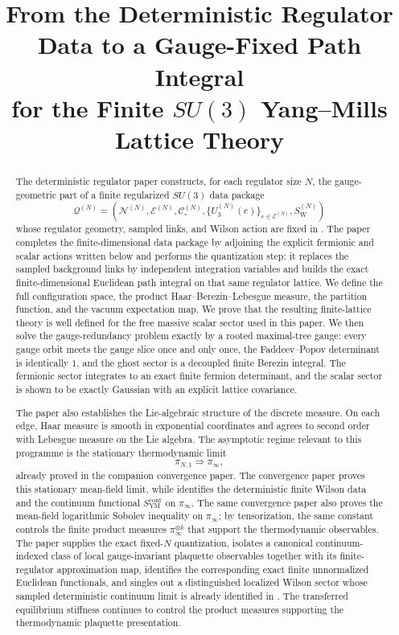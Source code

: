 \documentclass[11pt]{article}
\title{From the Deterministic Regulator Data to a Gauge-Fixed Path Integral\\
for the Finite $SU(3)$ Yang--Mills Lattice Theory}
\author{}
\date{}
\theoremstyle{remark}
\newcommand{\mcN}{\mathcal N}
\newcommand{\mcE}{\mathcal E}
\begin{document}
\maketitle

\begin{abstract}
The deterministic regulator paper constructs, for each regulator size \(N\), the
gauge-geometric part of a finite regularized \(SU(3)\) data package
\[
\mathcal Q^{(N)}=
(\mcN^{(N)},\mcE^{(N)},\mathcal C_\square^{(N)},
\{U_3^{(N)}(e)\}_{e\in\mcE^{(N)}},
S_{\mathrm W}^{(N)})
\]
whose regulator geometry, sampled links, and Wilson action are fixed in
\cite{continuumqft}.  The paper completes the finite-dimensional data
package by adjoining the explicit fermionic and scalar actions written below and
performs the
quantization step: it replaces the sampled background links by independent
integration variables and builds the exact finite-dimensional Euclidean path
integral on that same regulator lattice.  We define the full configuration
space, the product Haar--Berezin--Lebesgue measure, the partition function, and
the vacuum expectation map.  We prove that the resulting finite-lattice theory
is well defined for the free massive scalar sector used in this paper.  We then
solve the gauge-redundancy problem exactly by
a rooted maximal-tree gauge: every gauge orbit meets the gauge slice once and
only once, the Faddeev--Popov determinant is identically $1$, and the ghost
sector is a decoupled finite Berezin integral.  The fermionic sector integrates
to an exact finite fermion determinant, and the scalar sector is shown to be
exactly Gaussian with an explicit lattice covariance.

The paper also establishes the Lie-algebraic structure of the discrete measure.
On each edge, Haar measure is smooth in exponential coordinates and agrees to
second order with Lebesgue measure on the Lie algebra.
The asymptotic regime relevant to this programme is the stationary
thermodynamic limit
\[
\pi_{N,1}\Rightarrow \pi_\infty,
\]
already proved in the companion convergence paper.  The convergence paper
\cite{convergence} proves this stationary mean-field limit, while
\cite{continuumqft} identifies the deterministic finite Wilson data and the
continuum functional \(S_{\mathrm{YM}}^{\mathrm{cont}}\) on
$\pi_\infty$.  The same convergence paper also proves the mean-field
logarithmic Sobolev inequality on $\pi_\infty$; by tensorization, the same
constant controls the finite product measures $\pi_\infty^{\otimes k}$ that
support the thermodynamic observables.  The paper supplies the exact
fixed-$N$ quantization, isolates a canonical continuum-indexed class of local
gauge-invariant plaquette observables together with its finite-regulator
approximation map, identifies the corresponding exact finite unnormalized
Euclidean functionals, and singles out a distinguished localized Wilson sector
whose sampled deterministic continuum limit is already identified in
\cite{continuumqft}.  The transferred equilibrium stiffness continues to
control the product measures supporting the thermodynamic plaquette
presentation.
\end{abstract}
\end{document}
